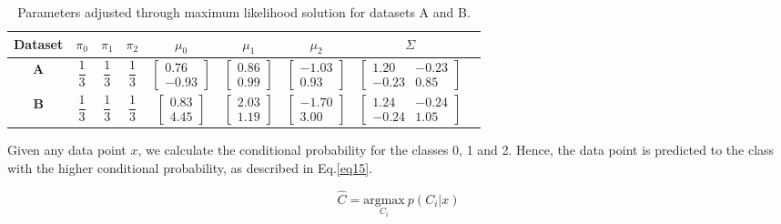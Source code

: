\documentclass{article}
\begin{document}
\begin{table}[h]
  \centering
  \caption{Parameters adjusted through maximum likelihood solution for datasets A and B.} \label{tab:1}
  \begin{tabular}{ccccccccc}
  \hline
  \textbf{Dataset} & \textbf{$\pi_0$} & \textbf{$\pi_1$} & \textbf{$\pi_2$} & \textbf{$\mu_0$} & \textbf{$\mu_1$} & \textbf{$\mu_2$} & \textbf{$\Sigma$} \\ \hline
  \textbf{A} & $\dfrac{1}{3}$ & $\dfrac{1}{3}$ & $\dfrac{1}{3}$ & $\left[\begin{array}{c} 0.76 \\ -0.93\end{array}\right]$ & $\left[\begin{array}{c} 0.86 \\ 0.99\end{array}\right]$ & $\left[\begin{array}{c} -1.03 \\ 0.93\end{array}\right]$ & $\left[\begin{array}{cc} 1.20 & -0.23\\ -0.23 & 0.85\end{array}\right]$ \\
  \textbf{B} & $\dfrac{1}{3}$ & $\dfrac{1}{3}$ & $\dfrac{1}{3}$ & $\left[\begin{array}{c} 0.83 \\ 4.45\end{array}\right]$ & $\left[\begin{array}{c} 2.03 \\ 1.19\end{array}\right]$ & $\left[\begin{array}{c} -1.70 \\ 3.00\end{array}\right]$ & $\left[\begin{array}{cc} 1.24 & -0.24\\ -0.24 & 1.05\end{array}\right]$  \\ \hline
 \end{tabular}
\end{table}

Given any data point $x$, we calculate the conditional probability for the classes 0, 1 and 2. Hence, the data point is predicted to the class with the higher conditional probability, as described in Eq.\eqref{eq15}.

\begin{equation}
  \label{eq15}
  \hat{C} = \underset{C_i}{\mathrm{argmax}}\:p(C_i|x)
\end{equation}
\end{document}
